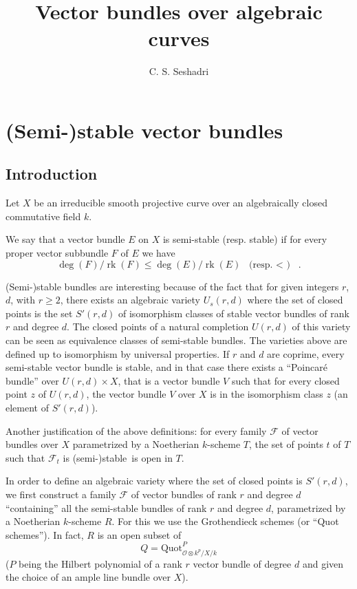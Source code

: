 \documentclass[12pt,a4paper]{book}
\title{Vector bundles over algebraic curves}
\author{C. S. Seshadri}
\date{ }
\DeclareMathOperator\rk{rk}
\def\FF{\mathscr{F}}
\def\OO{\mathscr{O}}
\def\Quot{\mathrm{Quot}}
\def\ss{\mbox{(semi-)stable }}
\theoremstyle{definition} \newtheorem{defn}[thm]{Definition}
\theoremstyle{definition} \newtheorem{ejs}[thm]{Examples}
\theoremstyle{definition} \newtheorem{ej}[thm]{Example}
\begin{document}
\maketitle
\tableofcontents

\chapter{(Semi-)stable vector bundles}
\section*{Introduction}
Let $X$ be an irreducible smooth projective curve over an algebraically closed commutative field $k$.

We say that a vector bundle $E$ on $X$ is semi-stable (resp. stable) if for every proper vector subbundle $F$ of $E$ we have
\begin{equation*}
  \deg(F)/\rk(F) \leq \deg(E)/\rk(E) \  \text{ (resp. $<$ ) }\ .
\end{equation*}

(Semi-)stable bundles are interesting because of the fact that for given integers $r$, $d$, with $r\geq 2$, there exists an algebraic variety $U_s(r,d)$ where the set of closed points is the set $S'(r,d)$ of isomorphism classes of stable vector bundles of rank $r$ and degree $d$. The closed points of a natural completion $U(r,d)$ of this variety can be seen as equivalence classes of semi-stable bundles. The varieties above are defined up to isomorphism by universal properties. If $r$ and $d$ are coprime, every semi-stable vector bundle is stable, and in that case there exists a ``Poincaré bundle'' over $U(r,d)\times X$, that is a vector bundle $V$ such that for every closed point $z$ of $U(r,d)$, the vector bundle $V$ over $X$ is in the isomorphism class $z$ (an element of $S'(r,d)$).

Another justification of the above definitions: for every family $\mathscr{F}$ of vector bundles over $X$ parametrized by a Noetherian $k$-scheme $T$, the set of points $t$ of $T$ such that $\FF_t$ is \ss  is open in $T$. 

In order to define an algebraic variety where the set of closed points is $S'(r,d)$, we first construct a family $\FF$ of vector bundles of rank $r$ and degree $d$ ``containing'' all the semi-stable bundles of rank $r$ and degree $d$, parametrized by a Noetherian $k$-scheme $R$. For this we use the Grothendieck schemes (or ``Quot schemes''). In fact, $R$ is an open subset of 
\begin{equation*}
  Q = \Quot^P_{\OO \otimes k^p/X/k}
\end{equation*}
($P$ being the Hilbert polynomial of a rank $r$ vector bundle of degree $d$ and given the choice of an ample line bundle over $X$).
\end{document}
